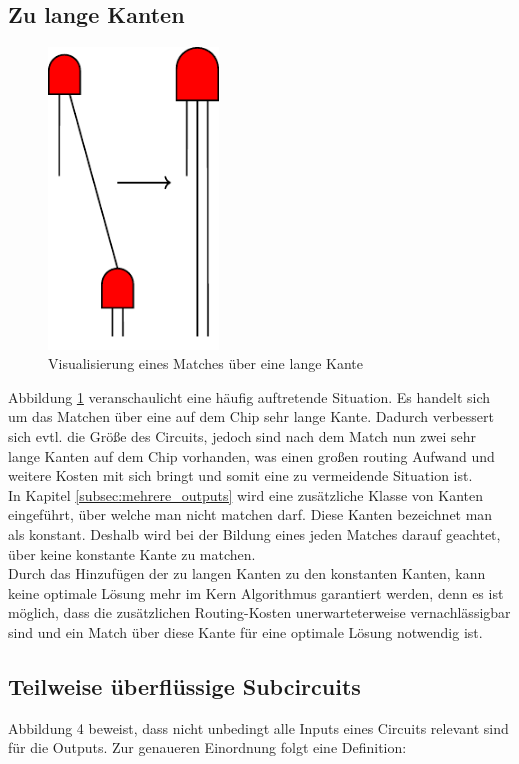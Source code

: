 \documentclass[11pt, a4paper, german]{article}
\begin{document}
\newpage
\subsection{Zu lange Kanten}
\label{subsec:zu_lange_kanten}
 \begin{figure}
		\includegraphics[height = 8cm]{pictures/compiled/zu_lange_kante}
		\caption{Visualisierung eines Matches über eine lange Kante}
		\label{bild:zu_lange_kanten}
\end{figure}
Abbildung \ref{bild:zu_lange_kanten} veranschaulicht eine häufig auftretende Situation. Es handelt sich um das Matchen über eine auf dem Chip sehr lange Kante. Dadurch verbessert sich evtl. die Größe des Circuits, jedoch sind nach dem Match nun zwei sehr lange Kanten auf dem Chip vorhanden, was   einen großen routing Aufwand und weitere Kosten mit sich bringt und somit eine zu vermeidende Situation ist. \\
In Kapitel \ref{subsec:mehrere_outputs} wird eine zusätzliche Klasse von Kanten eingeführt, über welche man nicht matchen darf.
Diese Kanten bezeichnet man als konstant.
Deshalb wird bei der Bildung eines jeden Matches darauf geachtet, über keine konstante Kante zu matchen.\\
Durch das Hinzufügen der zu langen Kanten zu den konstanten Kanten, kann keine optimale Lösung mehr im Kern Algorithmus garantiert werden, denn es ist möglich, dass die zusätzlichen Routing-Kosten unerwarteterweise vernachlässigbar sind und ein Match über diese Kante für eine optimale Lösung notwendig ist. \\

 \subsection{Teilweise überflüssige Subcircuits}
 \label{subsec:teilweise_ueberfkl_subcircuits}
 Abbildung 4 beweist, dass nicht unbedingt alle Inputs eines Circuits relevant sind für die Outputs. Zur genaueren Einordnung folgt eine Definition:
 
\end{document}
